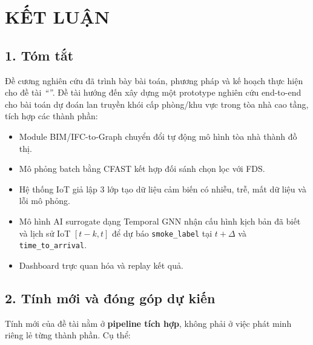
\chapter*{KẾT LUẬN}

\section*{1. Tóm tắt}

Đề cương nghiên cứu đã trình bày bài toán, phương pháp và kế hoạch thực hiện cho đề tài \textit{``\detai''}. Đề tài hướng đến xây dựng một prototype nghiên cứu end-to-end cho bài toán dự đoán lan truyền khói cấp phòng/khu vực trong tòa nhà cao tầng, tích hợp các thành phần:

\begin{itemize}
  \item Module BIM/IFC-to-Graph chuyển đổi tự động mô hình tòa nhà thành đồ thị.
  \item Mô phỏng batch bằng CFAST kết hợp đối sánh chọn lọc với FDS.
  \item Hệ thống IoT giả lập 3 lớp tạo dữ liệu cảm biến có nhiễu, trễ, mất dữ liệu và lỗi mô phỏng.
  \item Mô hình AI surrogate dạng Temporal GNN nhận cấu hình kịch bản đã biết và lịch sử IoT $[t-k,t]$ để dự báo \texttt{smoke\_label} tại $t+\Delta$ và \texttt{time\_to\_arrival}.
  \item Dashboard trực quan hóa và replay kết quả.
\end{itemize}

\section*{2. Tính mới và đóng góp dự kiến}

Tính mới của đề tài nằm ở \textbf{pipeline tích hợp}, không phải ở việc phát minh riêng lẻ từng thành phần. Cụ thể:

